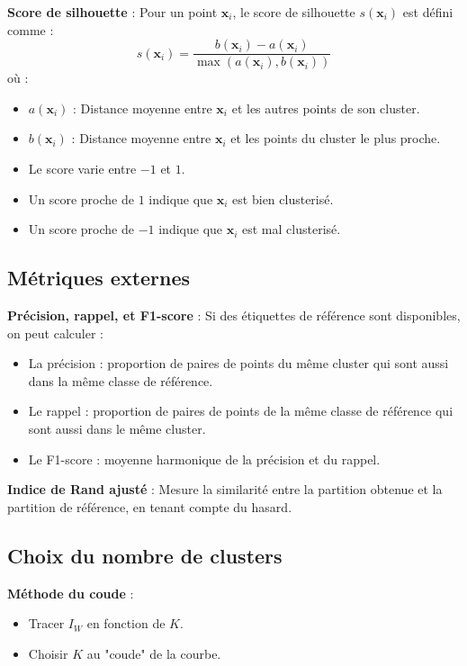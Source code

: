 \documentclass[10pt,a4paper]{article}
\begin{document}
\textbf{Score de silhouette} :
Pour un point $\mathbf{x}_i$, le score de silhouette $s(\mathbf{x}_i)$ est défini comme :
$$s(\mathbf{x}_i) = \frac{b(\mathbf{x}_i) - a(\mathbf{x}_i)}{\max(a(\mathbf{x}_i), b(\mathbf{x}_i))}$$
où :
\begin{itemize}
    \item $a(\mathbf{x}_i)$ : Distance moyenne entre $\mathbf{x}_i$ et les autres points de son cluster.
    \item $b(\mathbf{x}_i)$ : Distance moyenne entre $\mathbf{x}_i$ et les points du cluster le plus proche.
\end{itemize}
\begin{itemize}
    \item Le score varie entre $-1$ et $1$.
    \item Un score proche de $1$ indique que $\mathbf{x}_i$ est bien clusterisé.
    \item Un score proche de $-1$ indique que $\mathbf{x}_i$ est mal clusterisé.
\end{itemize}

\subsection*{Métriques externes}

\textbf{Précision, rappel, et F1-score} :
Si des étiquettes de référence sont disponibles, on peut calculer :
\begin{itemize}
    \item La précision : proportion de paires de points du même cluster qui sont aussi dans la même classe de référence.
    \item Le rappel : proportion de paires de points de la même classe de référence qui sont aussi dans le même cluster.
    \item Le F1-score : moyenne harmonique de la précision et du rappel.
\end{itemize}

\textbf{Indice de Rand ajusté} :
Mesure la similarité entre la partition obtenue et la partition de référence, en tenant compte du hasard.

\subsection*{Choix du nombre de clusters}

\textbf{Méthode du coude} :
\begin{itemize}
    \item Tracer $I_W$ en fonction de $K$.
    \item Choisir $K$ au "coude" de la courbe.
\end{itemize}
\end{document}
